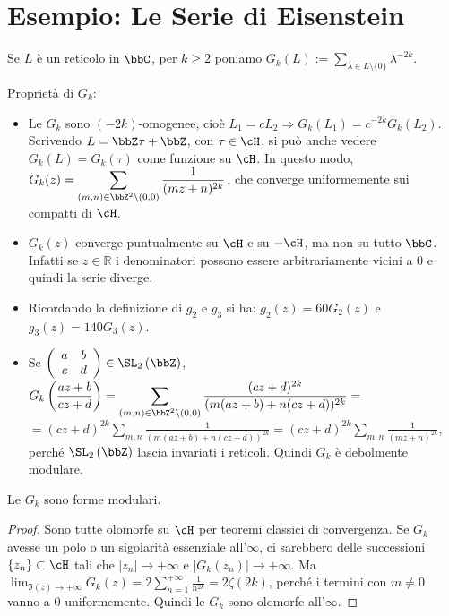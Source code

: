 \section{Esempio: Le Serie di Eisenstein}

\begin{definizione}
Se $L$ è un reticolo in $\bbC$, per $k \geq 2$ poniamo
$G_k(L):=\displaystyle{\sum_{\lambda \in L \setminus \{ 0 \}}{\lambda ^{-2k}}}$.
\end{definizione}

\begin{osservazione}
Proprietà di $G_k$:

\begin{itemize}
\item Le $G_k$ sono $(-2k)$-omogenee, cioè
$L_1=cL_2 \Rightarrow G_k(L_1)=c^{-2k}G_k(L_2)$.
Scrivendo $L=\bbZ \tau + \bbZ$, con $\tau \in \cH$,
si può anche vedere $G_k(L) = G_k(\tau)$ come funzione su $\cH$.
In questo modo, $\displaystyle{G_k(z)=\sum_{(m,n) \in \bbZ^2 \setminus
(0,0)}{\frac{1}{(mz+n)^{2k}}}}$, che converge uniformemente sui compatti
di $\cH$.
\item $G_k(z)$ converge puntualmente su $\cH$ e su $-\cH$, ma non su tutto $\bbC$. Infatti se $z \in \mathbb{R}$ i denominatori possono
essere arbitrariamente vicini a $0$ e quindi la serie diverge.
\item Ricordando la definizione di $g_2$ e $g_3$ si ha: $g_2(z)=60G_2(z)$ e $g_3(z)=140G_3(z)$.
\item Se $\left( \begin{array}{cc} a & b \\ c & d \end{array} \right) \in
\SL_2 \left( \bbZ \right)$,
$\displaystyle{ G_k \left(\frac{az+b}{cz+d} \right) = 
\sum_{(m,n) \in \bbZ^2 \setminus (0,0)}
{\frac{(cz+d)^{2k}} {(m(az+b)+n(cz+d))^{2k}}} =}$
$\displaystyle{ =(cz+d)^{2k} \sum_{m,n}{\frac{1} {(m(az+b)+n(cz+d))^{2k}}} =
(cz+d)^{2k} \sum_{m,n}{\frac{1}{(mz+n)^{2k}}} }$, perché
$\SL_2 \left( \bbZ \right)$ lascia invariati i reticoli. Quindi $G_k$
è debolmente modulare.
\end{itemize}
\end{osservazione}


\begin{proposizione}
Le $G_k$ sono forme modulari.
\end{proposizione}

\begin{proof}
Sono tutte olomorfe su $\cH$ per teoremi classici di convergenza.
Se $G_k$ avesse un polo o un sigolarità essenziale all'$\infty$, ci sarebbero
delle successioni $\{ z_n \} \subset \cH$ tali che
$|z_n| \rightarrow +\infty$ e $|G_k(z_n)| \rightarrow +\infty$.
Ma $\displaystyle{\lim_{\Im(z) \rightarrow +\infty} G_k(z)=
2 \sum_{n=1}^{+\infty}{\frac{1}{n^{2k}}} = 2 \zeta(2k)}$, perché i termini
con $m \neq 0$ vanno a $0$ uniformemente. Quindi le $G_k$ sono olomorfe
all'$\infty$.
\end{proof}

